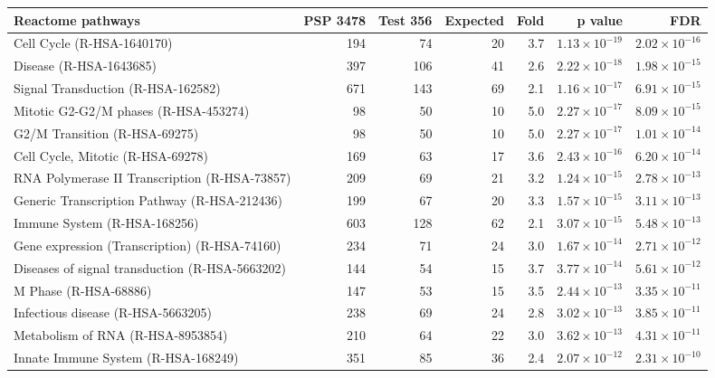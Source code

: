 \begin{table}[ht]
\centering
\begin{adjustbox}{width=\textwidth}
\begin{tabular}{lrrrrrr}
  \hline
Reactome pathways & PSP 3478 & Test 356 & Expected & Fold & p value & FDR \\ 
  \hline
Cell Cycle (R-HSA-1640170) & 194 & 74 & 20 & 3.7 & $1.13 \times 10^{-19}$ & $2.02 \times 10^{-16}$ \\ 
  Disease (R-HSA-1643685) & 397 & 106 & 41 & 2.6 & $2.22 \times 10^{-18}$ & $1.98 \times 10^{-15}$ \\ 
  Signal Transduction (R-HSA-162582) & 671 & 143 & 69 & 2.1 & $1.16 \times 10^{-17}$ & $6.91 \times 10^{-15}$ \\ 
  Mitotic G2-G2/M phases (R-HSA-453274) & 98 & 50 & 10 & 5.0 & $2.27 \times 10^{-17}$ & $8.09 \times 10^{-15}$ \\ 
  G2/M Transition (R-HSA-69275) & 98 & 50 & 10 & 5.0 & $2.27 \times 10^{-17}$ & $1.01 \times 10^{-14}$ \\ 
  Cell Cycle, Mitotic (R-HSA-69278) & 169 & 63 & 17 & 3.6 & $2.43 \times 10^{-16}$ & $6.20 \times 10^{-14}$ \\ 
  RNA Polymerase II Transcription (R-HSA-73857) & 209 & 69 & 21 & 3.2 & $1.24 \times 10^{-15}$ & $2.78 \times 10^{-13}$ \\ 
  Generic Transcription Pathway (R-HSA-212436) & 199 & 67 & 20 & 3.3 & $1.57 \times 10^{-15}$ & $3.11 \times 10^{-13}$ \\ 
  Immune System (R-HSA-168256) & 603 & 128 & 62 & 2.1 & $3.07 \times 10^{-15}$ & $5.48 \times 10^{-13}$ \\ 
  Gene expression (Transcription) (R-HSA-74160) & 234 & 71 & 24 & 3.0 & $1.67 \times 10^{-14}$ & $2.71 \times 10^{-12}$ \\ 
  Diseases of signal transduction (R-HSA-5663202) & 144 & 54 & 15 & 3.7 & $3.77 \times 10^{-14}$ & $5.61 \times 10^{-12}$ \\ 
  M Phase (R-HSA-68886) & 147 & 53 & 15 & 3.5 & $2.44 \times 10^{-13}$ & $3.35 \times 10^{-11}$ \\ 
  Infectious disease (R-HSA-5663205) & 238 & 69 & 24 & 2.8 & $3.02 \times 10^{-13}$ & $3.85 \times 10^{-11}$ \\ 
  Metabolism of RNA (R-HSA-8953854) & 210 & 64 & 22 & 3.0 & $3.62 \times 10^{-13}$ & $4.31 \times 10^{-11}$ \\ 
  Innate Immune System (R-HSA-168249) & 351 & 85 & 36 & 2.4 & $2.07 \times 10^{-12}$ & $2.31 \times 10^{-10}$ \\ 

\end{tabular}
\end{adjustbox}
\end{table}
